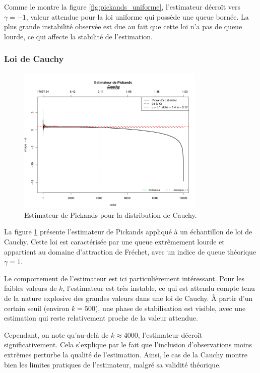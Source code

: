 \documentclass{article}
\begin{document}
Comme le montre la figure \ref{fig:pickands_uniforme}, l’estimateur décroît vers \(\gamma = -1\), valeur attendue pour la loi uniforme qui possède une queue bornée. La plus grande instabilité observée est due au fait que cette loi n’a pas de queue lourde, ce qui affecte la stabilité de l’estimation.

\subsubsection{Loi de Cauchy}

\begin{figure}[H]
    \centering
    \includegraphics[width=0.8\textwidth]{./images/cauchy.png}
    \caption{Estimateur de Pickands pour la distribution de Cauchy.}
    \label{fig:pickands_cauchy}
\end{figure}

La figure \ref{fig:pickands_cauchy} présente l’estimateur de Pickands appliqué à un échantillon de loi de Cauchy. Cette loi est caractérisée par une queue extrêmement lourde et appartient au domaine d’attraction de Fréchet, avec un indice de queue théorique \(\gamma = 1\).

Le comportement de l’estimateur est ici particulièrement intéressant. Pour les faibles valeurs de \(k\), l’estimateur est très instable, ce qui est attendu compte tenu de la nature explosive des grandes valeurs dans une loi de Cauchy. À partir d’un certain seuil (environ \(k = 500\)), une phase de stabilisation est visible, avec une estimation qui reste relativement proche de la valeur attendue.

Cependant, on note qu’au-delà de \(k \approx 4000\), l’estimateur décroît significativement. Cela s’explique par le fait que l’inclusion d’observations moins extrêmes perturbe la qualité de l’estimation.
Ainsi, le cas de la Cauchy montre bien les limites pratiques de l’estimateur, malgré sa validité théorique.
\end{document}
